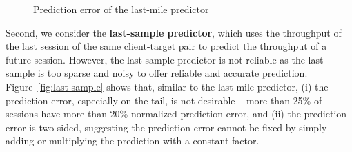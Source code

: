 \begin{packeditemize}
\begin{figure}[t!]
\centering
\caption{Prediction error of the last-mile predictor}
\label{fig:last-mile}
\end{figure}

\item Second, we consider the {\bf last-sample predictor}, which uses the throughput of the last session of the same client-target pair to predict the throughput of a future session. 
However, the last-sample predictor is not reliable as the last sample is too sparse and noisy to offer reliable and accurate prediction. 
Figure~\ref{fig:last-sample} shows that, similar to the last-mile predictor, (i) the prediction error, especially on the tail, is not desirable -- more than 25\% of sessions have more than 20\% normalized prediction error, and (ii) the prediction error is two-sided, suggesting the prediction error cannot be fixed by simply adding or multiplying the prediction with a constant factor.



\end{packeditemize}
